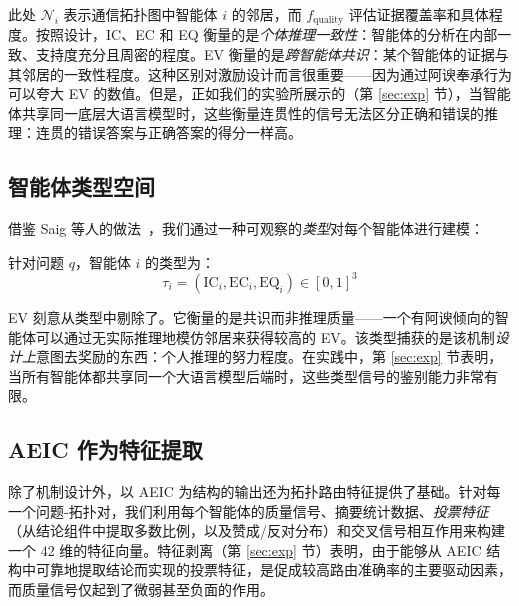 此处 $\mathcal{N}_i$ 表示通信拓扑图中智能体 $i$ 的邻居，而 $f_{\text{quality}}$ 评估证据覆盖率和具体程度。按照设计，IC、EC 和 EQ 衡量的是\emph{个体推理一致性}：智能体的分析在内部一致、支持度充分且周密的程度。EV 衡量的是\emph{跨智能体共识}：某个智能体的证据与其邻居的一致性程度。这种区别对激励设计而言很重要——因为通过阿谀奉承行为可以夸大 EV 的数值。但是，正如我们的实验所展示的（第 \ref{sec:exp} 节），当智能体共享同一底层大语言模型时，这些衡量连贯性的信号无法区分正确和错误的推理：连贯的错误答案与正确答案的得分一样高。

\subsection{智能体类型空间}
\label{sec:type}

借鉴 Saig 等人的做法~\cite{saig2024incentivizing}，我们通过一种可观察的\emph{类型}对每个智能体进行建模：

\begin{definition}[智能体类型]
针对问题 $q$，智能体 $i$ 的类型为：
\begin{equation}
    \tau_i = (\text{IC}_i, \text{EC}_i, \text{EQ}_i) \in [0,1]^3
\end{equation}
\end{definition}

EV 刻意从类型中剔除了。它衡量的是共识而非推理质量——一个有阿谀倾向的智能体可以通过无实际推理地模仿邻居来获得较高的 EV。该类型捕获的是该机制\emph{设计上}意图去奖励的东西：个人推理的努力程度。在实践中，第 \ref{sec:exp} 节表明，当所有智能体都共享同一个大语言模型后端时，这些类型信号的鉴别能力非常有限。

\subsection{AEIC 作为特征提取}
\label{sec:aeic_features}

除了机制设计外，以 AEIC 为结构的输出还为拓扑路由特征提供了基础。针对每一个问题-拓扑对，我们利用每个智能体的质量信号、摘要统计数据、\emph{投票特征}（从结论组件中提取多数比例，以及赞成/反对分布）和交叉信号相互作用来构建一个 42 维的特征向量。特征剥离（第 \ref{sec:exp} 节）表明，由于能够从 AEIC 结构中可靠地提取结论而实现的投票特征，是促成较高路由准确率的主要驱动因素，而质量信号仅起到了微弱甚至负面的作用。